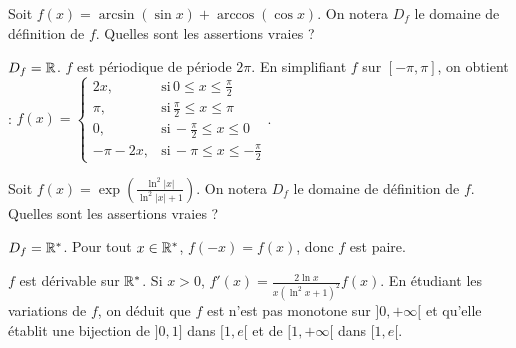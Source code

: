\begin{question} 
Soit $f(x)= \arcsin (\sin x) + \arccos (\cos x)$. On notera $D_f$ le domaine de définition de $f$.  Quelles sont les assertions vraies ?
\begin{answers}


      
     
    

   
\end{answers}
\begin{explanations}
$D_f=\mathbb{R}$. $f$ est périodique de période $2\pi$. En simplifiant $f$ sur $[-\pi, \pi]$, on obtient : 
$f(x) = \left\{\begin{array}{cccc}2x,& \mbox{si} \, 0\le x \le \frac{\pi}{2} \\ \pi ,& \mbox{si} \,\frac{\pi}{2} \le x \le \pi \\  0 ,& \mbox{si} \,-\frac{\pi}{2} \le x \le 0 \\ -\pi-2x ,& \mbox{si} \, -\pi \le x \le - \frac{\pi}{2} \end{array}\right.$.

\end{explanations}

\end{question}




\begin{question} 
Soit $f(x)= \exp ( \frac{\ln^2 |x|}{\ln^2 |x|+1})$. On notera $D_f$ le domaine de définition de $f$.  Quelles sont les assertions vraies ?
\begin{answers}
    \bad{$D_f=]0,+\infty[$}



     \bad{$f$ est croissante sur $]0,+\infty[$.}
     
    \good{$f$ est une bijection de $]0,1]$ dans $[1,e[$.}

   
\end{answers}
\begin{explanations}
$D_f= \mathbb{R}^*$. Pour tout $x\in \mathbb{R}^*$, $f(-x)=f(x)$, donc $f$ est paire.

$f$ est dérivable sur $\mathbb{R}^*$. Si $x>0$,  $f'(x)= \frac{2\ln x}{x(\ln^2x+1)^2}f(x)$. En étudiant les variations de $f$, on déduit que $f$ est n'est pas monotone sur $]0,+\infty[$ et qu'elle établit une bijection de $]0,1]$ dans $[1,e[$ et de $[1,+\infty[$ dans $[1,e[$.

\end{explanations}

\end{question}




